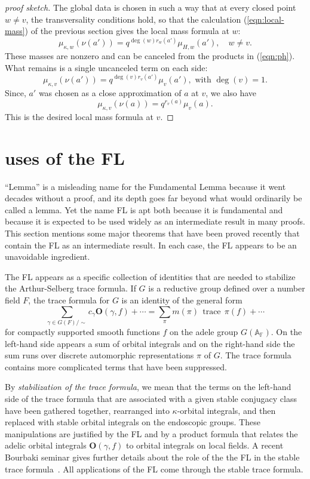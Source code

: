 \documentclass[brochure,english,12pt]{bourbaki}
\theoremstyle{plain}
\def\op#1{{\operatorname{#1}}}
\newcommand{\ring}[1]{\mathbb{#1}}
\def\OO{{\mathbf O}}
\begin{document}
\begin{proof}[proof sketch]
The global data is chosen in such a way that at every closed point
$w\ne v$, the transversality conditions hold, so that the calculation
(\ref{eqn:local-mass}) of the previous section gives the local mass
formula at $w$:
\[
\mu_{\kappa,w}(\nu(a')) = q^{\deg(w) r_w(a')}\mu_{H,w}(a'),\quad w\ne v.
\]  
These masses are nonzero and  can be canceled from 
the products in  (\ref{eqn:ph}).  What remains is a single uncanceled term on each side:
\[
\mu_{\kappa,v}(\nu(a')) = q^{\deg(v) r_v(a')}\mu_{v}(a'),\text{ with } \deg(v)=1.
\]
Since, $a'$ was chosen as a  close approximation of $a$ at  $v$, we also have
\[
\mu_{\kappa,v}(\nu(a)) = q^{r_v(a)}\mu_{v}(a).
\]
This is the desired local mass formula at  $v$.
\end{proof}



\section{uses of the FL}  \label{sec:uses}

``Lemma'' is a misleading name for the Fundamental Lemma because it
went decades without a proof, and its depth goes far beyond what would
ordinarily be called a lemma.  Yet the name FL is apt both because it
is fundamental and because it is expected to be used widely as an
intermediate result in many proofs.  This section mentions some major
theorems that have been proved recently that contain the FL as an
intermediate result.  In each case, the FL appears to be an
unavoidable ingredient.

The FL appears as a specific collection of identities
that are needed to stabilize the Arthur-Selberg trace formula.  
If $G$ is a reductive group defined over a number field $F$, 
the trace formula for $G$ is an identity of the general form
\[
\sum_{\gamma\in G(F)/\sim} c_\gamma \OO(\gamma,f) +\cdots = 
\sum_\pi m(\pi) \,\op{trace}\, \pi(f) + \cdots
\]
for compactly supported smooth functions $f$ on the adele group
$G(\ring{A_F})$.  On the left-hand side appears a sum of orbital integrals
and on the right-hand side the sum runs over discrete automorphic
representations $\pi$ of $G$.    The trace formula contains more complicated terms that have
been suppressed.

By {\it stabilization of the trace formula}, we mean that the terms on
the left-hand side of the trace formula that are associated with a
given stable conjugacy class have been gathered together, rearranged
into $\kappa$-orbital integrals, and then replaced with stable orbital
integrals on the endoscopic groups.  These manipulations are justified
by the FL and by a product formula that relates the adelic orbital
integrals $\OO(\gamma,f)$ to orbital integrals on local fields.  A
recent Bourbaki seminar gives further details about the role of the
the FL in the stable trace formula~\cite{Dat:2004}.  All applications
of the FL come through the stable trace formula.
\end{document}
